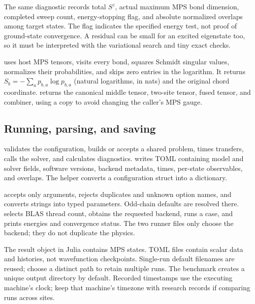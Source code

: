 The same diagnostic records total $S^z$, actual maximum MPS bond dimension, completed sweep count, energy-stopping flag, and absolute normalized overlaps among target states. The flag indicates the specified energy test, not proof of ground-state convergence. A residual can be small for an excited eigenstate too, so it must be interpreted with the variational search and tiny exact checks.

 uses host MPS tensors, visits every bond, squares Schmidt singular values, normalizes their probabilities, and skips zero entries in the logarithm. It returns $S_b=-\sum_a p_{b,a}\log p_{b,a}$ (natural logarithms, in nats) and the original chord coordinate.  returns the canonical middle tensor, two-site tensor, fused tensor, and combiner, using a copy to avoid changing the caller's MPS gauge.

\subsection{Running, parsing, and saving}
 validates the configuration, builds or accepts a shared problem, times transfers, calls the solver, and calculates diagnostics.  writes TOML containing model and solver fields, software versions, backend metadata, times, per-state observables, and overlaps. The helper  converts a configuration struct into a dictionary.

 accepts only  arguments, rejects duplicates and unknown option names, and  converts strings into typed parameters. Odd-chain defaults are resolved there.  selects BLAS thread count, obtains the requested backend, runs a case, and prints energies and convergence status. The two runner files only choose the backend; they do not duplicate the physics.

The result object in Julia contains MPS states. TOML files contain scalar data and histories, not wavefunction checkpoints. Single-run default filenames are reused; choose a distinct  path to retain multiple runs. The benchmark creates a unique output directory by default. Recorded timestamps use the executing machine's clock; keep that machine's timezone with research records if comparing runs across sites.


